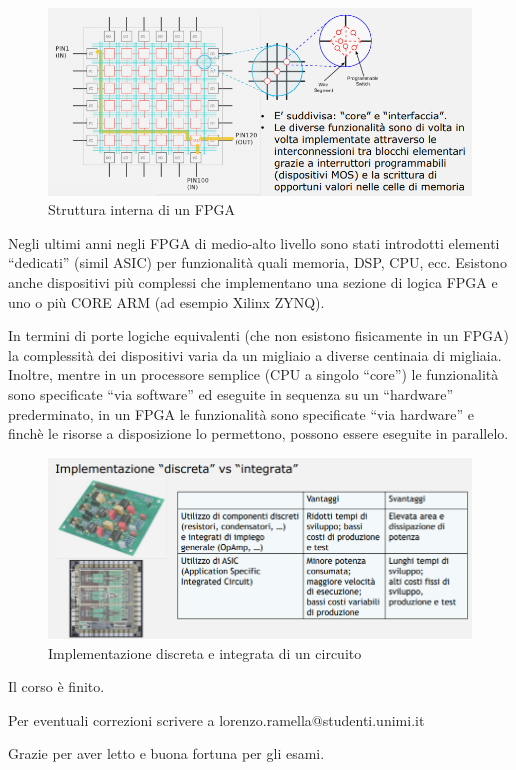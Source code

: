 \documentclass{article}
\begin{document}
\begin{figure}[h]
  \centering
  \includegraphics[scale=0.48]{IM_FPGA_struttura}
  \caption{Struttura interna di un FPGA}
  \label{FPGA_struttura}
\end{figure}

Negli ultimi anni negli FPGA di medio-alto livello sono stati introdotti elementi “dedicati” (simil ASIC) per funzionalità quali memoria, DSP, CPU, ecc. 
Esistono anche dispositivi più complessi che implementano una sezione di logica FPGA e uno o più CORE ARM (ad esempio Xilinx ZYNQ). 

\vspace{1mm}

In termini di porte logiche equivalenti (che non esistono fisicamente in un FPGA) la complessità dei dispositivi varia da un migliaio a diverse centinaia di migliaia.
Inoltre, mentre in un processore semplice (CPU a singolo “core”) le funzionalità sono specificate “via software” ed eseguite in sequenza su un “hardware” prederminato, in un FPGA le funzionalità sono specificate “via hardware” e finchè le risorse a disposizione lo permettono, possono essere eseguite in parallelo.

\begin{figure}[h]
  \centering
  \includegraphics[scale=0.5]{IM_discreta_vs_integrata}
  \caption{Implementazione discreta e integrata di un circuito}
  \label{discreta_vs_integrata}
\end{figure}

\clearpage

\hspace{0pt}
\vfill
\begin{center}
Il corso è finito. 

Per eventuali correzioni scrivere a lorenzo.ramella@studenti.unimi.it

Grazie per aver letto e buona fortuna per gli esami.
\end{center}
\vfill
\hspace{0pt}
\end{document}
